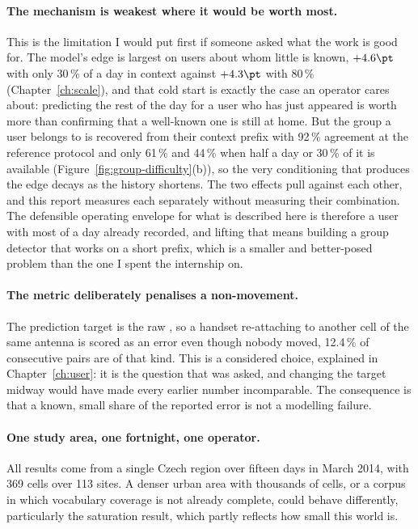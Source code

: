\paragraph{The mechanism is weakest where it would be worth most.} This is the
limitation I would put first if someone asked what the work is good for. The
model's edge is largest on users about whom little is known, $+4.6\pt$ with only
30\,\% of a day in context against $+4.3\pt$ with 80\,\%
(Chapter~\ref{ch:scale}), and that cold start is exactly the case an operator
cares about: predicting the rest of the day for a user who has just appeared is
worth more than confirming that a well-known one is still at home. But the group
a user belongs to is recovered from their context prefix with 92\,\% agreement at
the reference protocol and only 61\,\% and 44\,\% when half a day or 30\,\% of it
is available (Figure~\ref{fig:group-difficulty}(b)), so the very conditioning
that produces the edge decays as the history shortens. The two effects pull
against each other, and this report measures each separately without measuring
their combination. The defensible operating envelope for what is described here
is therefore a user with most of a day already recorded, and lifting that means
building a group detector that works on a short prefix, which is a smaller and
better-posed problem than the one I spent the internship on.

\paragraph{The metric deliberately penalises a non-movement.} The prediction
target is the raw , so a handset re-attaching to another cell of
the same antenna is scored as an error even though nobody moved, 12.4\,\% of
consecutive pairs are of that kind. This is a considered choice, explained in
Chapter~\ref{ch:user}: it is the question that was asked, and changing the target
midway would have made every earlier number incomparable. The consequence is
that a known, small share of the reported error is not a modelling failure.

\paragraph{One study area, one fortnight, one operator.} All results come from a
single Czech region over fifteen days in March 2014, with 369 cells over 113
sites. A denser urban area with thousands of cells, or a corpus in which
vocabulary coverage is not already complete, could behave differently,
particularly the saturation result, which partly reflects how small this world
is.

